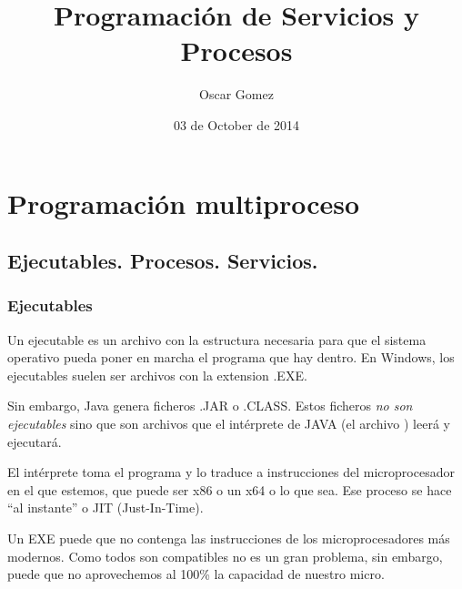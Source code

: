 \documentclass[a4paper,12pt,spanish]{sphinxmanual}
\title{Programación de Servicios y Procesos}
\date{03 de October de 2014}
\author{Oscar Gomez}
\begin{document}
\maketitle
\tableofcontents
{}\label{index::doc}



\chapter{Programación multiproceso}
\label{textos/tema1::doc}\label{textos/tema1:programacion-de-servicios-y-procesos}\label{textos/tema1:programacion-multiproceso}

\section{Ejecutables. Procesos. Servicios.}
\label{textos/tema1:ejecutables-procesos-servicios}

\subsection{Ejecutables}
\label{textos/tema1:ejecutables}
Un ejecutable es un archivo con la estructura necesaria para que el sistema operativo pueda poner en marcha el programa que hay dentro. En Windows, los ejecutables suelen ser archivos con la extension .EXE.

Sin embargo, Java genera ficheros .JAR o .CLASS. Estos ficheros \emph{no son ejecutables} sino que son archivos que el intérprete de JAVA (el archivo ) leerá y ejecutará.

El intérprete toma el programa y lo traduce a instrucciones del microprocesador en el que estemos, que puede ser x86 o un x64 o lo que sea. Ese proceso se hace ``al instante'' o JIT (Just-In-Time).

Un EXE puede que no contenga las instrucciones de los microprocesadores más modernos. Como todos son compatibles no es un gran problema, sin embargo, puede que no aprovechemos al 100\% la capacidad de nuestro micro.
\end{document}

